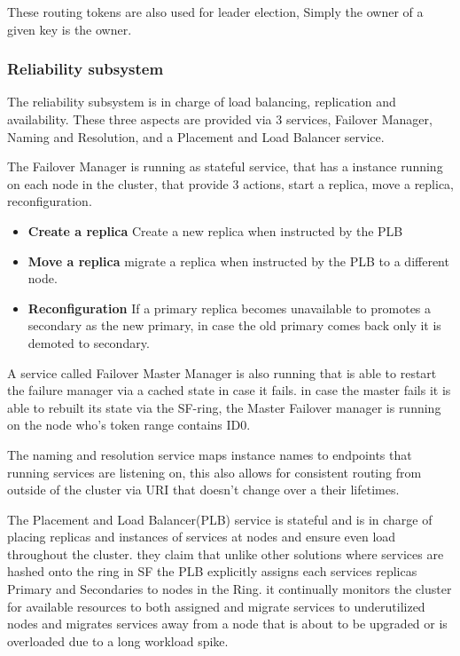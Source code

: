 \documentclass[a4paper,10pt,titlepage]{report}
\begin{document}
These routing tokens are also used for leader election, Simply the owner of a given key is the owner.

\subsubsection{Reliability subsystem}
The reliability subsystem is in charge of load balancing, replication and availability. These three aspects are provided via 3 services, Failover Manager, Naming and Resolution, and a Placement and Load Balancer service.\\
\vspace{5mm}

The Failover Manager is running as stateful service, that has a instance running on each node in the cluster, that provide 3 actions, start a replica, move a replica, reconfiguration.\\
\vspace{5mm}

\begin{itemize}
\item \textbf{Create a replica} Create a new replica when instructed by the PLB
\item \textbf{Move a replica} migrate a replica when instructed by the PLB to a different node.
    \item \textbf{Reconfiguration} If a primary replica becomes unavailable to promotes a secondary as the new primary, in case the old primary comes back only it is demoted to secondary. 
\end{itemize}

A service called Failover Master Manager is also running that is able to restart the failure manager via a cached state in case it fails. in case the master fails it is able to rebuilt its state via the SF-ring, the Master Failover manager is running on the node who's token range contains ID0.\\
\vspace{5mm}

The naming and resolution service maps instance names to endpoints that running services are listening on, this also allows for consistent routing from outside of the cluster via URI that doesn't change over a their lifetimes.\\
\vspace{5mm} 

The Placement and Load Balancer(PLB) service is stateful and is in charge of placing replicas and instances of services at nodes and ensure even load throughout the cluster. they claim that unlike other solutions where services are hashed onto the ring in SF the PLB explicitly assigns each services replicas Primary and Secondaries to nodes in the Ring. it continually monitors the cluster for available resources to both assigned and migrate services to underutilized nodes and migrates services away from a node that is about to be upgraded or is overloaded due to a long workload spike.\\
\vspace{5mm}
\end{document}
